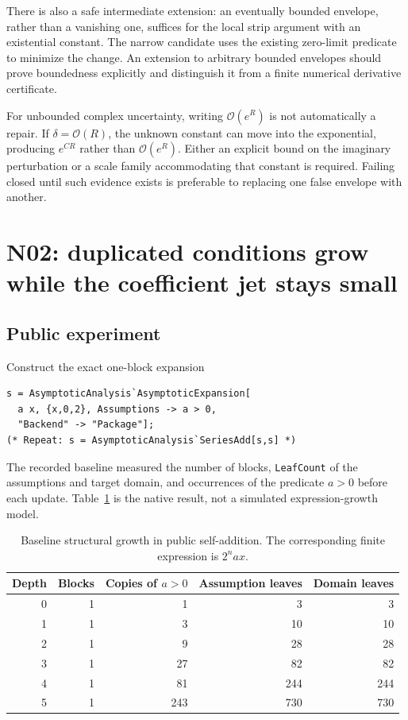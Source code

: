 \documentclass[11pt,a4paper]{article}
\newcommand{\OO}{\mathcal O}
\begin{document}
There is also a safe intermediate extension: an eventually bounded envelope, rather than a vanishing one, suffices for the local strip argument with an existential constant. The narrow candidate uses the existing zero-limit predicate to minimize the change. An extension to arbitrary bounded envelopes should prove boundedness explicitly and distinguish it from a finite numerical derivative certificate.

For unbounded complex uncertainty, writing $\OO(e^{R})$ is not automatically a repair. If $\delta=\OO(R)$, the unknown constant can move into the exponential, producing $e^{C R}$ rather than $\OO(e^R)$. Either an explicit bound on the imaginary perturbation or a scale family accommodating that constant is required. Failing closed until such evidence exists is preferable to replacing one false envelope with another.

\section{N02: duplicated conditions grow while the coefficient jet stays small}
\label{sec:n02}
\subsection{Public experiment}
Construct the exact one-block expansion
\begin{lstlisting}
s = AsymptoticAnalysis`AsymptoticExpansion[
  a x, {x,0,2}, Assumptions -> a > 0,
  "Backend" -> "Package"];
(* Repeat: s = AsymptoticAnalysis`SeriesAdd[s,s] *)
\end{lstlisting}
The recorded baseline measured the number of blocks, \texttt{LeafCount} of the assumptions and target domain, and occurrences of the predicate $a>0$ before each update. Table~\ref{tab:conditions} is the native result, not a simulated expression-growth model.

\begin{table}[htbp]
\centering\small
\begin{tabular}{@{}rrrrr@{}}
\toprule
Depth & Blocks & Copies of $a>0$ & Assumption leaves & Domain leaves\\
\midrule
0 & 1 & 1 & 3 & 3\\
1 & 1 & 3 & 10 & 10\\
2 & 1 & 9 & 28 & 28\\
3 & 1 & 27 & 82 & 82\\
4 & 1 & 81 & 244 & 244\\
5 & 1 & 243 & 730 & 730\\
\bottomrule
\end{tabular}
\caption{Baseline structural growth in public self-addition. The corresponding finite expression is $2^n a x$.}
\label{tab:conditions}
\end{table}
\end{document}
